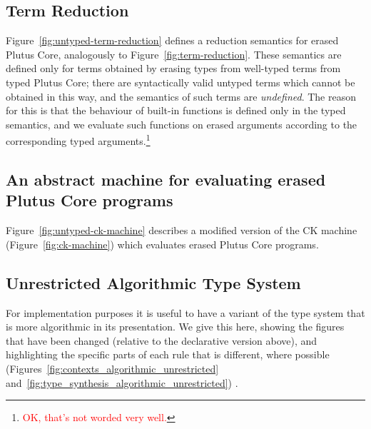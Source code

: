 \documentclass[a4paper]{article}
\newcommand{\red}[1]{\textcolor{red}{#1}}
\newcommand{\redfootnote}[1]{\red{\footnote{\red{#1}}}}
\begin{document}


\subsection{Term Reduction}
Figure~\ref{fig:untyped-term-reduction} defines a reduction semantics
for erased Plutus Core, analogously to
Figure~\ref{fig:term-reduction}.  These semantics are defined only for
terms obtained by erasing types from well-typed terms from typed
Plutus Core; there are syntactically valid untyped terms which cannot
be obtained in this way, and the semantics of such terms
are \textit{undefined}.  The reason for this is that the behaviour of
built-in functions is defined only in the typed semantics, and we
evaluate such functions on erased arguments according to the
corresponding typed arguments.\redfootnote{OK, that's not worded very well.}



\subsection{An abstract machine for evaluating erased Plutus Core programs}
Figure~\ref{fig:untyped-ck-machine} describes a modified version of
the CK machine (Figure~\ref{fig:ck-machine}) which evaluates erased Plutus
Core programs.


\newpage
\begin{appendices}
\section{Unrestricted Algorithmic Type System}

For implementation purposes it is useful to have a variant of the type
system that is more algorithmic in its presentation. We give this
here, showing the figures that have been changed (relative to the
declarative version above), and highlighting the specific parts of
each rule that is different, where possible
(Figures~\ref{fig:contexts_algorithmic_unrestricted}
and~\ref{fig:type_synthesis_algorithmic_unrestricted}) .



\end{appendices}


\end{document}
